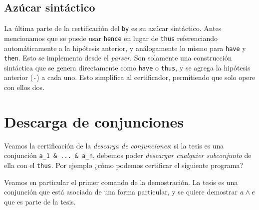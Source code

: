 \subsection{Azúcar sintáctico}

La última parte de la certificación del \lstinline{by} es su azúcar sintáctico. Antes mencionamos que se puede usar \lstinline{hence} en lugar de \lstinline{thus} referenciando automáticamente a la hipótesis anterior, y análogamente lo mismo para \lstinline{have} y \lstinline{then}. Esto se implementa desde el \textit{parser}. Son solamente una construcción sintáctica que se genera directamente como \lstinline{have} o \lstinline{thus}, y se agrega la hipótesis anterior (\lstinline{-}) a cada uno. Esto simplifica al certificador, permitiendo que solo opere con ellos dos.

\section{Descarga de conjunciones}

Veamos la certificación de la \textit{descarga de conjunciones}: si la tesis es una conjunción \lstinline{a_1 & ... & a_n}, debemos poder \textit{descargar cualquier subconjunto} de ella con el \lstinline{thus}. Por ejemplo ¿cómo podemos certificar el siguiente programa?



Veamos en particular el primer comando de la demostración. La tesis es una conjunción que está asociada de una forma particular, y se quiere demostrar $a \wedge e$ que es parte de la tesis.

